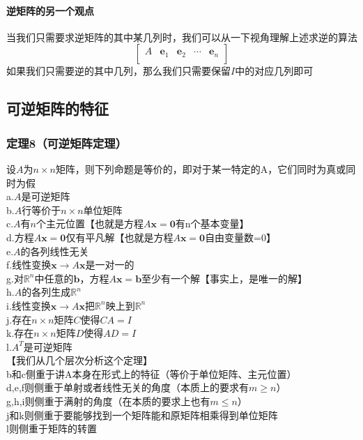 \documentclass{article}
\newcommand{\ve}{\boldsymbol}
\begin{document}
\begin{CJK}{UTF8}{gkai}
\paragraph{逆矩阵的另一个观点\\}
当我们只需要求逆矩阵的其中某几列时，我们可以从一下视角理解上述求逆的算法
\[\begin{bmatrix}

    A&\ve{e}_1&\ve{e}_2&\cdots&\ve{e}_n\\
\end{bmatrix}\]
如果我们只需要逆的其中几列，那么我们只需要保留$I$中的对应几列即可\\
\subsection{可逆矩阵的特征}
\subsubsection{定理8（可逆矩阵定理）}
设$A$为$n\times n$矩阵，则下列命题是等价的，即对于某一特定的A，它们同时为真或同时为假\\
a.$A$是可逆矩阵\\
b.$A$行等价于$n\times n$单位矩阵\\
c.$A$有$n$个主元位置【也就是方程$A\ve{x}=\ve{0}$有n个基本变量】\\
d.方程$A\ve{x}=\ve{0}$仅有平凡解【也就是方程$A\ve{x}=\ve{0}$自由变量数=0】\\
e.$A$的各列线性无关\\
f.线性变换$\ve{x}\to A\ve{x}$是一对一的\\
g.对$\mathbb{R}^n$中任意的$\ve{b}$，方程$A\ve{x}=\ve{b}$至少有一个解【事实上，是唯一的解】\\
h.$A$的各列生成$\mathbb{R}^n$\\
i.线性变换$\ve{x}\to A\ve{x}$把$\mathbb{R}^n$映上到$\mathbb{R}^n$\\
j.存在$n\times n$矩阵$C$使得$CA=I$\\
k.存在$n\times n$矩阵$D$使得$AD=I$\\
l.$A^T$是可逆矩阵\\

【我们从几个层次分析这个定理】\\
b和c侧重于讲A本身在形式上的特征（等价于单位矩阵、主元位置）\\
d,e,f则侧重于单射或者线性无关的角度（本质上的要求有$m\geq n$）\\
g,h,i则侧重于满射的角度（在本质的要求上也有$m\leq n$）\\
j和k则侧重于要能够找到一个矩阵能和原矩阵相乘得到单位矩阵\\
l则侧重于矩阵的转置\\


\end{CJK}
\end{document}
